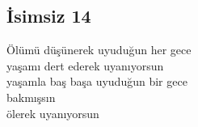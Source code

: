 \subsection{İsimsiz 14}

Ölümü düşünerek uyuduğun her gece \\
yaşamı dert ederek uyanıyorsun \\
yaşamla baş başa uyuduğun bir gece \\
	bakmışsın \\
		ölerek uyanıyorsun \\